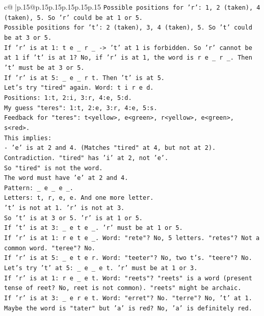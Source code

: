 \documentclass{article}
\begin{document}
{\begin{supertabular}{c@{$\;$}|p{.15\linewidth}@{}p{.15\linewidth}p{.15\linewidth}p{.15\linewidth}p{.15\linewidth}p{.15\linewidth}}
{{{\texttt{Possible positions for 'r': 1, 2 (taken), 4 (taken), 5. So 'r' could be at 1 or 5.} \\
\texttt{Possible positions for 't': 2 (taken), 3, 4 (taken), 5. So 't' could be at 3 or 5.} \\
\texttt{If 'r' is at 1: t e \_ r \_ {-}> 't' at 1 is forbidden. So 'r' cannot be at 1 if 't' is at 1? No, if 'r' is at 1, the word is r e \_ r \_. Then 't' must be at 3 or 5.} \\
\texttt{If 'r' is at 5: \_ e \_ r t. Then 't' is at 5.} \\
\texttt{Let's try "tired" again. Word: t i r e d.} \\
\texttt{Positions: 1:t, 2:i, 3:r, 4:e, 5:d.} \\
\texttt{My guess "teres": 1:t, 2:e, 3:r, 4:e, 5:s.} \\
\texttt{Feedback for "teres": t<yellow>, e<green>, r<yellow>, e<green>, s<red>.} \\
\texttt{This implies:} \\
\texttt{{-} 'e' is at 2 and 4. (Matches "tired" at 4, but not at 2). Contradiction. "tired" has 'i' at 2, not 'e'.} \\
\texttt{So "tired" is not the word.} \\
\texttt{The word must have 'e' at 2 and 4.} \\
\texttt{Pattern: \_ e \_ e \_.} \\
\texttt{Letters: t, r, e, e. And one more letter.} \\
\texttt{'t' is not at 1. 'r' is not at 3.} \\
\texttt{So 't' is at 3 or 5. 'r' is at 1 or 5.} \\
\texttt{If 't' is at 3: \_ e t e \_. 'r' must be at 1 or 5.} \\
\texttt{If 'r' is at 1: r e t e \_. Word: "rete"? No, 5 letters. "retes"? Not a common word. "teree"? No.} \\
\texttt{If 'r' is at 5: \_ e t e r. Word: "teeter"? No, two t's. "teere"? No.} \\
\texttt{Let's try 't' at 5: \_ e \_ e t. 'r' must be at 1 or 3.} \\
\texttt{If 'r' is at 1: r e \_ e t. Word: "reets"? "reets" is a word (present tense of reet? No, reet is not common). "reets" might be archaic.} \\
\texttt{If 'r' is at 3: \_ e r e t. Word: "erret"? No. "terre"? No, 't' at 1.} \\
\texttt{Maybe the word is "tater" but 'a' is red? No, 'a' is definitely red.} \\
}}}
\end{supertabular}}
\end{document}

